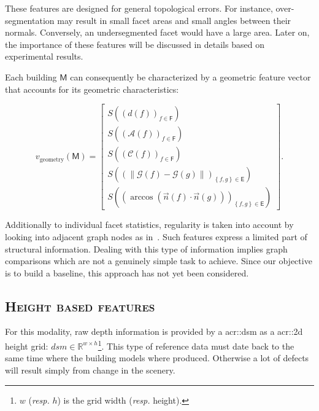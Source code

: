         These features are designed for general topological errors.
        For instance, over-segmentation may result in small facet areas and small angles between their normals.
        Conversely, an undersegmented facet would have a large area.
        Later on, the importance of these features will be discussed in details based on experimental results.
        
        Each building $\mathsf{M}$ can consequently be characterized by a geometric feature vector that accounts for its geometric characteristics:

        \begin{equation}
        	\label{eq::geometric_features}
            v_{\text{geometry}}(\mathsf{M}) = \begin{bmatrix}
            	S \left(\left(d\left(f\right)\right)_{f \in \mathsf{F}}\right)\\
                S \left(\left(\mathscr{A}\left(f\right)\right)_{f \in \mathsf{F}}\right)\\
                S \left(\left(\mathscr{C}\left(f\right)\right)_{f \in \mathsf{F}}\right)\\
                S \left(\left( \left\lVert \mathscr{G}\left(f\right) - \mathscr{G}\left(g\right) \right\rVert \right)_{\left\{f, g\right\} \in \mathsf{E}}\right)\\
                S\left(\left( \arccos\left(\vec{n}\left(f\right) \cdot \vec{n}\left(g\right)\right) \right)_{\left\{f, g\right\} \in \mathsf{E}}\right)
            \end{bmatrix}.
        \end{equation}

        Additionally to individual facet statistics, regularity is taken into account by looking into adjacent graph nodes as in~\parencite{zhou20102}.
        Such features express a limited  part of structural information.
        Dealing with this type of information implies graph comparisons which are not a genuinely simple task to achieve.
        Since our objective is to build a baseline, this approach has not yet been considered.

    \subsection{\textsc{Height based features}}
        \label{subsec::learned_evaluation::baseline::height}
        For this modality, raw depth information is provided by a \gls{acr::dsm} as a \gls{acr::2d} height grid: $dsm \in \mathbb{R}^{w\times h}$\footnote{$w$ (\textit{resp.} $h$) is the grid width (\textit{resp.} height).}.
        This type of reference data must date back to the same time where the building models where produced.
        Otherwise a lot of defects will result simply from change in the scenery.\\

